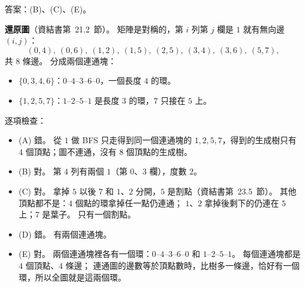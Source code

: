 \begin{pastsoln}
答案：(B)、(C)、(E)。

\textbf{還原圖}（資結書第~21.2~節）。 矩陣是對稱的，第 $i$ 列第 $j$ 欄是 $1$ 就有無向邊 $(i, j)$：
\[
(0, 4),\ (0, 6),\ (1, 2),\ (1, 5),\ (2, 5),\ (3, 4),\ (3, 6),\ (5, 7),
\]
共 $8$ 條邊。 分成兩個連通塊：
\begin{itemize}
\item $\{0, 3, 4, 6\}$：$0$--$4$--$3$--$6$--$0$，一個長度 $4$ 的環。
\item $\{1, 2, 5, 7\}$：$1$--$2$--$5$--$1$ 是長度 $3$ 的環，$7$ 只接在 $5$ 上。
\end{itemize}
\begin{center}
\end{center}

逐項檢查：
\begin{itemize}
\item (A) 錯。 從 $1$ 做 BFS 只走得到同一個連通塊的 $1, 2, 5, 7$，得到的生成樹只有 $4$ 個頂點；圖不連通，沒有 $8$ 個頂點的生成樹。
\item (B) 對。 第 $4$ 列有兩個 $1$（第 $0$、$3$ 欄），度數 $2$。
\item (C) 對。 拿掉 $5$ 以後 $7$ 和 $1$、$2$ 分開，$5$ 是割點（資結書第~23.5~節）。 其他頂點都不是：$4$ 個點的環拿掉任一點仍連通；
$1$、$2$ 拿掉後剩下的仍連在 $5$ 上；$7$ 是葉子。 只有一個割點。
\item (D) 錯。 有兩個連通塊。
\item (E) 對。 兩個連通塊裡各有一個環：$0$--$4$--$3$--$6$--$0$ 和 $1$--$2$--$5$--$1$。 每個連通塊都是 $4$ 個頂點、$4$ 條邊；
連通圖的邊數等於頂點數時，比樹多一條邊，恰好有一個環，所以全圖就是這兩個環。
\end{itemize}
\end{pastsoln}
